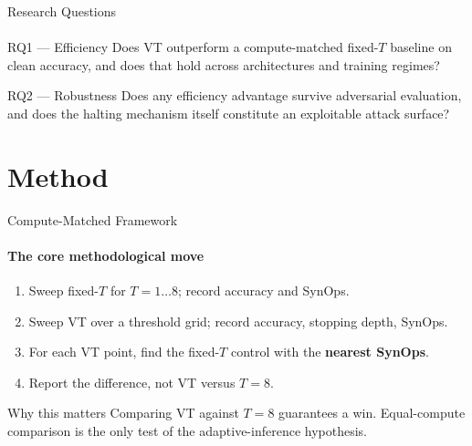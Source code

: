 \documentclass[aspectratio=169,11pt]{beamer}
\newcommand{\FIX}[1]{\textcolor{cfixed}{#1}}
\newcommand{\VT}[1]{\textcolor{cvt}{#1}}
\begin{document}
\begin{frame}{Research Questions}\framesubtitle{}
\begin{block}{RQ1 --- Efficiency}
Does VT outperform a \FIX{compute-matched fixed-$T$} baseline on clean accuracy, and
does that hold across architectures and training regimes?
\end{block}
\begin{block}{RQ2 --- Robustness}
Does any efficiency advantage survive adversarial evaluation, and does the halting
mechanism itself constitute an exploitable attack surface?
\end{block}
\end{frame}

\section{Method}
\begin{frame}{Compute-Matched Framework}\framesubtitle{The core methodological move}
\begin{enumerate}
  \item Sweep \FIX{fixed-$T$} for $T=1 \ldots 8$; record accuracy and SynOps.
  \item Sweep \VT{VT} over a threshold grid; record accuracy, stopping depth, SynOps.
  \item For each VT point, find the fixed-$T$ control with the \textbf{nearest SynOps}.
  \item Report the difference, not VT versus $T=8$.
\end{enumerate}
\begin{alertblock}{Why this matters}
Comparing VT against $T=8$ guarantees a win. Equal-compute comparison is the only test
of the adaptive-inference hypothesis.
\end{alertblock}
\end{frame}
\end{document}
